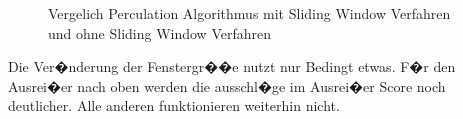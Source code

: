 \begin{figure}[h]
	\centering
	\caption{Vergelich Perculation Algorithmus mit Sliding Window Verfahren und ohne Sliding Window Verfahren}
	\label{img:midasTSresults}
\end{figure}


Die Ver�nderung der Fenstergr��e nutzt nur Bedingt etwas. F�r den Ausrei�er nach oben werden die ausschl�ge im Ausrei�er Score noch deutlicher. Alle anderen funktionieren weiterhin nicht.

